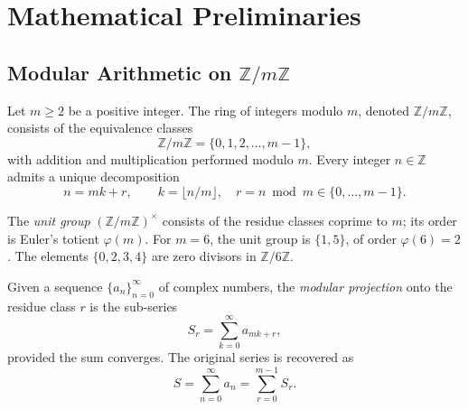 \documentclass[12pt,a4paper]{article}
\theoremstyle{plain}
\theoremstyle{definition}
\theoremstyle{remark}
\begin{document}
\section{Mathematical Preliminaries}
\label{sec:prelim}

\subsection{Modular Arithmetic on \(\mathbb{Z}/m\mathbb{Z}\)}
Let \(m \ge 2\) be a positive integer. The ring of integers modulo \(m\), denoted \(\mathbb{Z}/m\mathbb{Z}\), consists of the equivalence classes
\begin{equation}
\mathbb{Z}/m\mathbb{Z} = \{0, 1, 2, \dots, m-1\},
\end{equation}
with addition and multiplication performed modulo \(m\). Every integer \(n \in \mathbb{Z}\) admits a unique decomposition
\begin{equation}
n = m k + r, \qquad k = \lfloor n/m \rfloor, \quad r = n \bmod m \in \{0, \dots, m-1\}.
\label{eq:divalg}
\end{equation}

The \emph{unit group} \((\mathbb{Z}/m\mathbb{Z})^{\times}\) consists of the residue classes coprime to \(m\); its order is Euler's totient \(\varphi(m)\). For \(m=6\), the unit group is \(\{1,5\}\), of order \(\varphi(6)=2\). The elements \(\{0,2,3,4\}\) are zero divisors in \(\mathbb{Z}/6\mathbb{Z}\).

Given a sequence \(\{a_n\}_{n=0}^{\infty}\) of complex numbers, the \emph{modular projection} onto the residue class \(r\) is the sub-series
\begin{equation}
S_r = \sum_{k=0}^{\infty} a_{mk + r},
\label{eq:Sr}
\end{equation}
provided the sum converges. The original series is recovered as
\begin{equation}
S = \sum_{n=0}^{\infty} a_n = \sum_{r=0}^{m-1} S_r.
\label{eq:recovery}
\end{equation}
\end{document}
